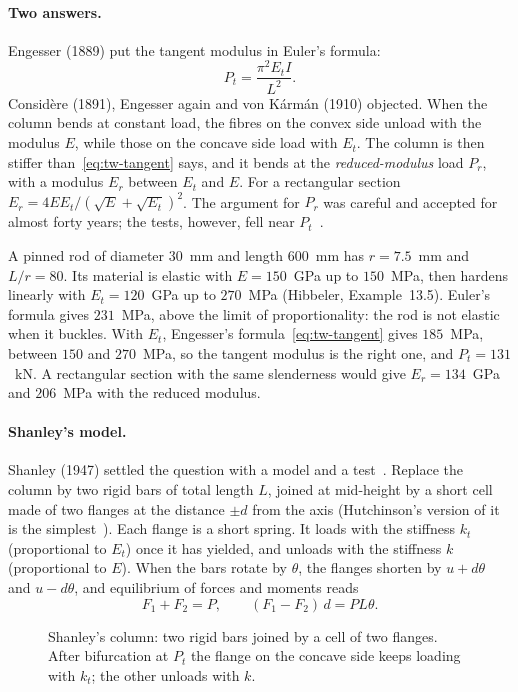 \paragraph{Two answers.}
%
Engesser (1889) put the tangent modulus in Euler's formula:
\begin{equation}\label{eq:tw-tangent}
  P_t = \frac{\pi^2E_tI}{L^2} .
\end{equation}
Considère (1891), Engesser again and von Kármán (1910) objected. When the column bends at
constant load, the fibres on the convex side unload with the modulus $E$, while those on the
concave side load with $E_t$. The column is then stiffer than~\eqref{eq:tw-tangent} says, and it
bends at the \emph{reduced-modulus} load $P_r$, with a modulus $E_r$ between $E_t$ and $E$. For a
rectangular section $E_r = 4EE_t/(\sqrt E + \sqrt{E_t})^2$. The argument for $P_r$ was
careful and accepted for almost forty years; the tests, however, fell near
$P_t$~\cite[pp.~67--68]{tw-hutchinson1974}.

\begin{example}\label{ex:tw-rod}
%
A pinned rod of diameter $30$~mm and length $600$~mm has $r = 7.5$~mm and $L/r = 80$. Its material
is elastic with $E = 150$~GPa up to $150$~MPa, then hardens linearly with $E_t = 120$~GPa up to
$270$~MPa (Hibbeler, Example~13.5). Euler's formula gives $231$~MPa, above the limit of
proportionality: the rod is not elastic when it buckles. With $E_t$, Engesser's
formula~\eqref{eq:tw-tangent} gives $185$~MPa, between $150$ and $270$~MPa, so the tangent
modulus is the right one, and $P_t = 131$~kN. A rectangular section with the same slenderness
would give $E_r = 134$~GPa and $206$~MPa with the reduced modulus.
\end{example}

\paragraph{Shanley's model.}
%
Shanley (1947) settled the question with a model and a test~\cite{tw-shanley1947}. Replace
the column by two rigid bars of total length $L$, joined at mid-height by a short cell made
of two flanges at the distance $\pm d$ from the axis (Hutchinson's version of it is the
simplest~\cite[Section~II.A]{tw-hutchinson1974}). Each flange is a short spring. It
loads with the stiffness $k_t$ (proportional to $E_t$) once it has yielded, and unloads with the
stiffness $k$ (proportional to $E$). When the bars rotate by $\theta$, the flanges shorten by
$u + d\theta$ and $u - d\theta$, and equilibrium of forces and moments reads
\begin{equation}\label{eq:tw-shanley-eq}
  F_1 + F_2 = P,
  \qquad
  (F_1 - F_2)\,d = P L\theta .
\end{equation}
\begin{figure}[ht]
  \centering
  
  \caption{Shanley's column: two rigid bars joined by a cell of two flanges. After bifurcation at $P_t$ the
    flange on the concave side keeps loading with $k_t$; the other unloads with $k$.}
  \label{fig:tw-shanley-model}
\end{figure}

